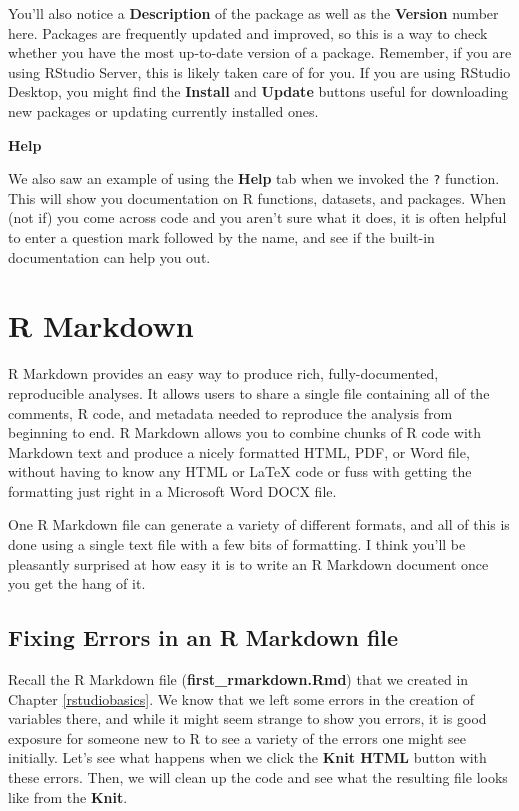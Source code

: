 \documentclass[]{tufte-book}
\begin{document}
You'll also notice a \textbf{Description} of the package as well as the \textbf{Version} number here. Packages are frequently updated and improved, so this is a way to check whether you have the most up-to-date version of a package. Remember, if you are using RStudio Server, this is likely taken care of for you. If you are using RStudio Desktop, you might find the \textbf{Install} and \textbf{Update} buttons useful for downloading new packages or updating currently installed ones.

\vspace*{0.2in}

\noindent\textbf{Help}\vspace*{0.1in}

We also saw an example of using the \textbf{Help} tab when we invoked the \texttt{?} function. This will show you documentation on R functions, datasets, and packages. When (not if) you come across code and you aren't sure what it does, it is often helpful to enter a question mark followed by the name, and see if the built-in documentation can help you out.

\hypertarget{rmarkdown}{%
\chapter{R Markdown}\label{rmarkdown}}

R Markdown provides an easy way to produce rich, fully-documented, reproducible analyses. It allows users to share a single file containing all of the comments, R code, and metadata needed to reproduce the analysis from beginning to end. R Markdown allows you to combine chunks of R code with Markdown text and produce a nicely formatted HTML, PDF, or Word file, without having to know any HTML or LaTeX code or fuss with getting the formatting just right in a Microsoft Word DOCX file.

One R Markdown file can generate a variety of different formats, and all of this is done using a single text file with a few bits of formatting. I think you'll be pleasantly surprised at how easy it is to write an R Markdown document once you get the hang of it.

\hypertarget{fixerrors}{%
\section{Fixing Errors in an R Markdown file}\label{fixerrors}}

Recall the R Markdown file (\textbf{first\_rmarkdown.Rmd}) that we created in Chapter \ref{rstudiobasics}. We know that we left some errors in the creation of variables there, and while it might seem strange to show you errors, it is good exposure for someone new to R to see a variety of the errors one might see initially. Let's see what happens when we click the \textbf{Knit HTML} button with these errors. Then, we will clean up the code and see what the resulting file looks like from the \textbf{Knit}.
\end{document}

